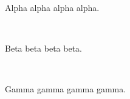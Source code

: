 \documentclass[11pt]{article}
\newcommand{\cvsection}[1]{\vspace{6pt}{\large\bfseries #1}\\[-6pt]\vspace{2pt}}
\begin{document}
Alpha alpha alpha alpha.

\cvsection{Education}

Beta beta beta beta.

\cvsection{Experience}

Gamma gamma gamma gamma.
\end{document}
